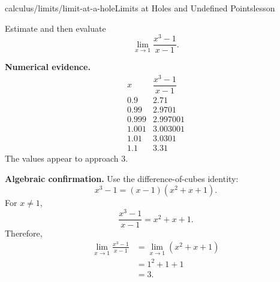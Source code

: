 \begin{webpage}{calculus/limits/limit-at-a-hole}{Limits at Holes and Undefined Points}{lesson}
\begin{bgexample}[title={Table, graph, and algebra agree}]
Estimate and then evaluate
\[
  \lim_{x\to1}\frac{x^3-1}{x-1}.
\]

\begin{bgsolution}
\textbf{Numerical evidence.}
\[
\begin{array}{c|c}
 x & \dfrac{x^3-1}{x-1}\\
\hline
0.9&2.71\\
0.99&2.9701\\
0.999&2.997001\\
1.001&3.003001\\
1.01&3.0301\\
1.1&3.31
\end{array}
\]
The values appear to approach \(3\).

\textbf{Algebraic confirmation.} Use the difference-of-cubes identity:
\[
  x^3-1=(x-1)(x^2+x+1).
\]
For \(x\ne1\),
\[
  \frac{x^3-1}{x-1}=x^2+x+1.
\]
Therefore,
\[
\begin{aligned}
\lim_{x\to1}\frac{x^3-1}{x-1}
&=\lim_{x\to1}(x^2+x+1)\\
&=1^2+1+1\\
&=\boxed{3}.
\end{aligned}
\]
\end{bgsolution}
\end{bgexample}
\end{webpage}

